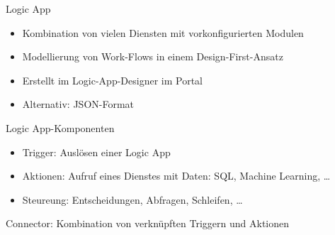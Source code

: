 
\begin{flashcard}[Definition]{Logic App}
    \begin{itemize}
        \item Kombination von vielen Diensten mit vorkonfigurierten Modulen
        \item Modellierung von Work-Flows in einem Design-First-Ansatz
        \item Erstellt im Logic-App-Designer im Portal
        \item Alternativ: JSON-Format
    \end{itemize}
\end{flashcard}

\begin{flashcard}[Definition]{Logic App-Komponenten}
    \begin{itemize}
        \item Trigger:\newline
            Auslösen einer Logic App
        \item Aktionen:\newline
            Aufruf eines Dienstes mit Daten: SQL, Machine Learning, \ldots
        \item Steureung:\newline
            Entscheidungen, Abfragen, Schleifen, \ldots
    \end{itemize}
    \vspace{1cm}
    Connector: Kombination von verknüpften Triggern und Aktionen
\end{flashcard}

